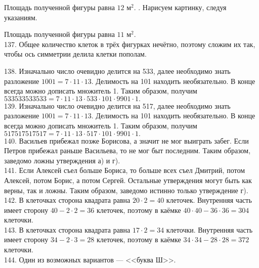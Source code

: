 Площадь полученной фигуры равна $12\text{ м}^2.$
\newpage{}. Нарисуем картинку, следуя указаниям.
\begin{center}
\begin{figure}[ht!]
\end{figure}
\end{center}
Площадь полученной фигуры равна $11\text{ м}^2.$\\
137. Общее количество клеток в трёх фигурках нечётно, поэтому сложим их так, чтобы ось симметрии делила клетки пополам.
\begin{center}
\begin{figure}[ht!]
\end{figure}
\end{center}
138. Изначально число очевидно делится на 533, далее необходимо знать разложение $1001=7\cdot11\cdot13.$ Делимость на 101 находить необязательно. В конце всегда можно дописать множитель 1. Таким образом, получим $533533533533=7\cdot11\cdot13\cdot533\cdot101\cdot9901\cdot1.$\\
139. Изначально число очевидно делится на 517, далее необходимо знать разложение $1001=7\cdot11\cdot13.$ Делимость на 101 находить необязательно. В конце всегда можно дописать множитель 1. Таким образом, получим $517517517517=7\cdot11\cdot13\cdot517\cdot101\cdot9901\cdot1.$\\
140. Васильев прибежал позже Борисова, а значит не мог выиграть забег. Если Петров прибежал раньше Васильева, то не мог быт последним. Таким образом, заведомо ложны утверждения а) и г).\\
141. Если Алексей съел больше Бориса, то больше всех съел Дмитрий, потом Алексей, потом Борис, а потом Сергей. Остальные утверждения могут быть как верны, так и ложны. Таким образом, заведомо истинно только утверждение г).\\
142. В клеточках сторона квадрата равна $20\cdot2=40$ клеточек. Внутренняя часть имеет сторону $40-2\cdot2=36$ клеточек, поэтому в каёмке $40\cdot40-36\cdot36=304$ клеточки.\\
143. В клеточках сторона квадрата равна $17\cdot2=34$ клеточки. Внутренняя часть имеет сторону $34-2\cdot3=28$ клеточек, поэтому в каёмке $34\cdot34-28\cdot28=372$ клеточки.\\
144. Один из возможных вариантов --- <<буква Ш>>.
\begin{center}
\begin{figure}[ht!]
\end{figure}
\end{center}\newpage\noindent

